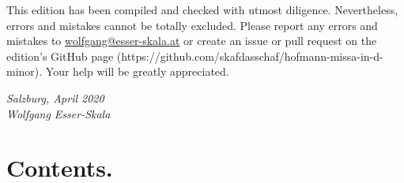 \documentclass[parskip=full]{scrreprt}
\newif\iftemplate\templatetrue
\begin{document}
This edition has been compiled and checked with utmost diligence. Nevertheless, errors and mistakes cannot be totally excluded. Please report any errors and mistakes to \url{wolfgang@esser-skala.at} or create an issue or pull request on the edition’s GitHub page (https://github.com/skafdasschaf/hofmann-missa-in-d-minor). Your help will be greatly appreciated.

\bigskip
\textit{Salzburg, April 2020\\
Wolfgang Esser-Skala}


\chapter*{Contents.}



\cleardoublepage
\fi

\iftemplate

\fi
\end{document}
